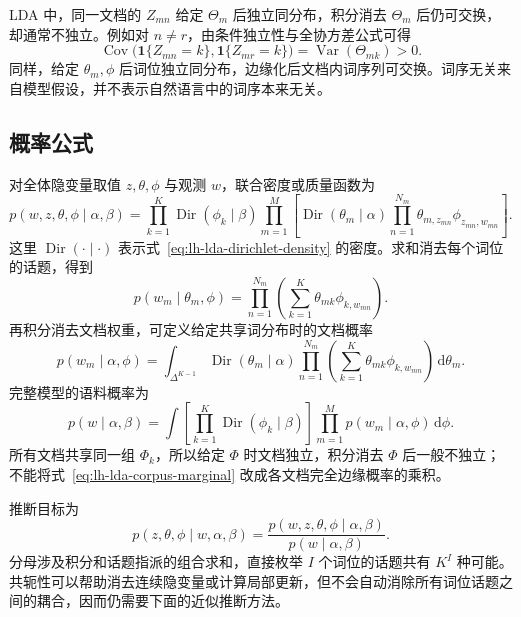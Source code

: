 LDA 中，同一文档的 $Z_{mn}$ 给定 $\Theta_m$ 后独立同分布，积分消去 $\Theta_m$ 后仍可交换，却通常不独立。例如对 $n\ne r$，由条件独立性与全协方差公式可得
\begin{equation}
\operatorname{Cov}\bigl(\mathbf1\{Z_{mn}=k\},\mathbf1\{Z_{mr}=k\}\bigr)
=\operatorname{Var}(\Theta_{mk})>0.
\label{eq:lh-lda-topic-dependence}
\end{equation}
同样，给定 $\theta_m,\phi$ 后词位独立同分布，边缘化后文档内词序列可交换。词序无关来自模型假设，并不表示自然语言中的词序本来无关。

\subsection{概率公式}
\label{subsec:lh-lda-probability-formulas}

对全体隐变量取值 $z,\theta,\phi$ 与观测 $w$，联合密度或质量函数为
\begin{equation}
p(w,z,\theta,\phi\mid\alpha,\beta)
=\prod_{k=1}^K\operatorname{Dir}(\phi_k\mid\beta)
\prod_{m=1}^M\left[
\operatorname{Dir}(\theta_m\mid\alpha)
\prod_{n=1}^{N_m}\theta_{m,z_{mn}}\phi_{z_{mn},w_{mn}}
\right].
\label{eq:lh-lda-full-joint}
\end{equation}
这里 $\operatorname{Dir}(\cdot\mid\cdot)$ 表示式~\eqref{eq:lh-lda-dirichlet-density} 的密度。求和消去每个词位的话题，得到
\begin{equation}
p(w_m\mid\theta_m,\phi)
=\prod_{n=1}^{N_m}\left(\sum_{k=1}^K\theta_{mk}\phi_{k,w_{mn}}\right).
\label{eq:lh-lda-document-conditional}
\end{equation}
再积分消去文档权重，可定义给定共享词分布时的文档概率
\begin{equation}
p(w_m\mid\alpha,\phi)
=\int_{\Delta^{K-1}}\operatorname{Dir}(\theta_m\mid\alpha)
\prod_{n=1}^{N_m}\left(\sum_{k=1}^K\theta_{mk}\phi_{k,w_{mn}}\right)\,\mathrm d\theta_m.
\label{eq:lh-lda-document-marginal}
\end{equation}
完整模型的语料概率为
\begin{equation}
p(w\mid\alpha,\beta)
=\int\left[\prod_{k=1}^K\operatorname{Dir}(\phi_k\mid\beta)\right]
\prod_{m=1}^Mp(w_m\mid\alpha,\phi)\,\mathrm d\phi.
\label{eq:lh-lda-corpus-marginal}
\end{equation}
所有文档共享同一组 $\Phi_k$，所以给定 $\Phi$ 时文档独立，积分消去 $\Phi$ 后一般不独立；不能将式~\eqref{eq:lh-lda-corpus-marginal} 改成各文档完全边缘概率的乘积。

推断目标为
\[
p(z,\theta,\phi\mid w,\alpha,\beta)
=\frac{p(w,z,\theta,\phi\mid\alpha,\beta)}{p(w\mid\alpha,\beta)}.
\]
分母涉及积分和话题指派的组合求和，直接枚举 $I$ 个词位的话题共有 $K^I$ 种可能。共轭性可以帮助消去连续隐变量或计算局部更新，但不会自动消除所有词位话题之间的耦合，因而仍需要下面的近似推断方法。

